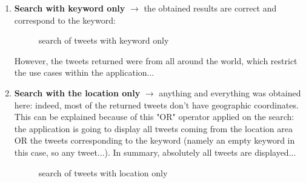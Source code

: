 \documentclass[a4paper,11pt]{report}
\begin{document}
\begin{enumerate}
	\item \textbf{Search with keyword only} $\to$ the obtained results are correct and correspond to the keyword:
	\begin{figure}[H]
	\vspace{-5pt}
	\begin{center}
	\vspace{-5pt}
	\caption{search of tweets with keyword only}
	\end{center}
	\end{figure}
	\vspace{-20pt}
	
	However, the tweets returned were from all around the world, which restrict the use cases within the application...
	
	\item \textbf{Search with the location only} $\to$ anything and everything was obtained here: indeed, most of the returned tweets don't have geographic coordinates. This can be explained because of this "OR" operator applied on the search: the application is going to display all tweets coming from the location area OR the tweets corresponding to the keyword (namely an empty keyword in this case, so any tweet...). In summary, absolutely all tweets are displayed...
	\begin{figure}[H]
	\vspace{-5pt}
	\begin{center}
	\vspace{-5pt}
	\caption{search of tweets with location only}
	\end{center}
	\end{figure}
	\vspace{-20pt}
	

\end{enumerate}
\end{document}

